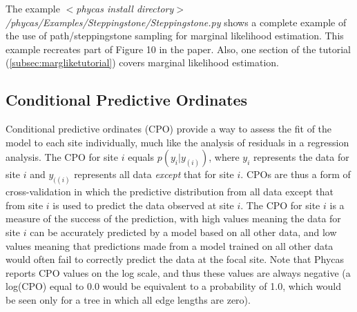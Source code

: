 \documentclass[10pt]{article}
\newcommand{\pathname}[1]{{\em #1}}				%
\begin{document}
The example \pathname{$<$phycas install directory$>$/phycas/Examples/Steppingstone/Steppingstone.py} shows a complete example of the use of path/steppingstone sampling for marginal likelihood estimation. This example recreates part of Figure 10 in the \citet{XieLewisFanKuoChen2010} paper. Also, one section of the tutorial (\ref{subsec:margliketutorial}) covers marginal likelihood estimation.

\subsection{Conditional Predictive Ordinates}\label{cpo}
Conditional predictive ordinates (CPO) provide a way to assess the fit of the model to each site individually, much like the analysis of residuals in a regression analysis. The CPO for site $i$ equals $p(y_i|y_{(i)})$, where $y_i$ represents the data for site $i$ and $y_{((i)}$ represents all data {\em except} that for site $i$. CPOs are thus a form of cross-validation in which the predictive distribution from all data except that from site $i$ is used to predict the data observed at site $i$. The CPO for site $i$ is a measure of the success of the prediction, with high values meaning the data for site $i$ can be accurately predicted by a model based on all other data, and low values meaning that predictions made from a model trained on all other data would often fail to correctly predict the data at the focal site. Note that Phycas reports CPO values on the log scale, and thus these values are always negative (a log(CPO) equal to 0.0 would be equivalent to a probability of 1.0, which would be seen only for a tree in which all edge lengths are zero).
\end{document}
